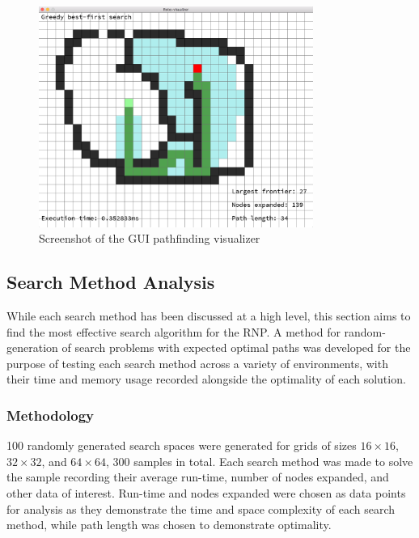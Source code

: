 \begin{figure}[H]
	\centering
	\includegraphics[width=0.8\textwidth]{Resources/vis.png}
	\caption{Screenshot of the GUI pathfinding visualizer}
\end{figure}


\subsection{Search Method Analysis} %
\label{sub:search_method_analysis}
While each search method has been discussed at a high level, this section aims to find the most effective search algorithm for the RNP. A method for random-generation of search problems with expected optimal paths was developed for the purpose of testing each search method across a variety of environments, with their time and memory usage recorded alongside the optimality of each solution.

\subsubsection{Methodology} %
\label{sub:methodology}

100 randomly generated search spaces were generated for grids of sizes $16 \times 16$, $32 \times 32$, and $64 \times 64$, 300 samples in total. Each search method was made to solve the sample recording their average run-time, number of nodes expanded, and other data of interest. Run-time and nodes expanded were chosen as data points for analysis as they demonstrate the time and space complexity of each search method, while path length was chosen to demonstrate optimality.

